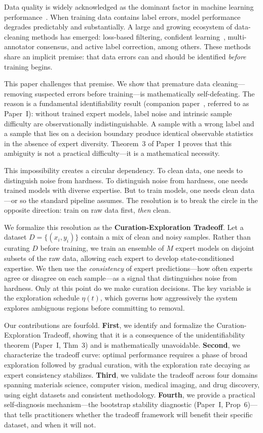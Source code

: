 Data quality is widely acknowledged as the dominant factor in machine learning performance~\cite{placeholder}. When training data contains label errors, model performance degrades predictably and substantially. A large and growing ecosystem of data-cleaning methods has emerged: loss-based filtering, confident learning~\cite{northcutt2021}, multi-annotator consensus, and active label correction, among others. These methods share an implicit premise: that data errors can and should be identified \emph{before} training begins.

This paper challenges that premise. We show that premature data cleaning---removing suspected errors before training---is mathematically self-defeating. The reason is a fundamental identifiability result (companion paper~\cite{xi2025fundamental}, referred to as Paper~I): without trained expert models, label noise and intrinsic sample difficulty are observationally indistinguishable. A sample with a wrong label and a sample that lies on a decision boundary produce identical observable statistics in the absence of expert diversity. Theorem~3 of Paper~I proves that this ambiguity is not a practical difficulty---it is a mathematical necessity.

This impossibility creates a circular dependency. To clean data, one needs to distinguish noise from hardness. To distinguish noise from hardness, one needs trained models with diverse expertise. But to train models, one needs clean data---or so the standard pipeline assumes. The resolution is to break the circle in the opposite direction: train on raw data first, \emph{then} clean.

We formalize this resolution as the \textbf{Curation-Exploration Tradeoff}. Let a dataset $D = \{(x_i, y_i)\}$ contain a mix of clean and noisy samples. Rather than curating $D$ before training, we train an ensemble of $M$ expert models on disjoint subsets of the raw data, allowing each expert to develop state-conditioned expertise. We then use the \emph{consistency} of expert predictions---how often experts agree or disagree on each sample---as a signal that distinguishes noise from hardness. Only at this point do we make curation decisions. The key variable is the exploration schedule $\eta(t)$, which governs how aggressively the system explores ambiguous regions before committing to removal.

Our contributions are fourfold. \textbf{First}, we identify and formalize the Curation-Exploration Tradeoff, showing that it is a consequence of the unidentifiability theorem (Paper~I, Thm~3) and is mathematically unavoidable. \textbf{Second}, we characterize the tradeoff curve: optimal performance requires a phase of broad exploration followed by gradual curation, with the exploration rate decaying as expert consistency stabilizes. \textbf{Third}, we validate the tradeoff across four domains spanning materials science, computer vision, medical imaging, and drug discovery, using eight datasets and consistent methodology. \textbf{Fourth}, we provide a practical self-diagnosis mechanism---the bootstrap stability diagnostic (Paper~I, Prop~6)---that tells practitioners whether the tradeoff framework will benefit their specific dataset, and when it will not.

